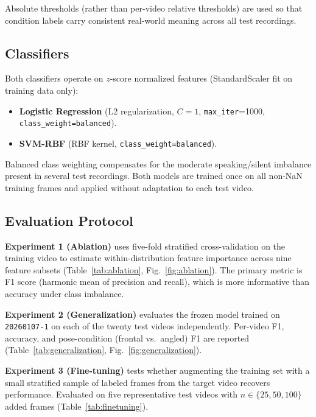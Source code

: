\documentclass[conference]{IEEEtran}
\begin{document}
Absolute thresholds (rather than per-video relative thresholds) are used so that
condition labels carry consistent real-world meaning across all test recordings.

\subsection{Classifiers}

Both classifiers operate on $z$-score normalized features
(StandardScaler fit on training data only):

\begin{itemize}
  \item \textbf{Logistic Regression} (L2 regularization, $C\!=\!1$,
        \texttt{max\_iter}=1000, \texttt{class\_weight=balanced}).
  \item \textbf{SVM-RBF} (RBF kernel, \texttt{class\_weight=balanced}).
\end{itemize}

Balanced class weighting compensates for the moderate speaking/silent imbalance
present in several test recordings.
Both models are trained once on all non-NaN training frames and applied without
adaptation to each test video.

\subsection{Evaluation Protocol}

\textbf{Experiment 1 (Ablation)} uses five-fold stratified cross-validation on the
training video to estimate within-distribution feature importance across nine feature
subsets (Table~\ref{tab:ablation}, Fig.~\ref{fig:ablation}).
The primary metric is F1 score (harmonic mean of precision and recall), which is
more informative than accuracy under class imbalance.

\textbf{Experiment 2 (Generalization)} evaluates the frozen model trained on
\texttt{20260107-1} on each of the twenty test videos independently.
Per-video F1, accuracy, and pose-condition (frontal vs.\ angled) F1 are reported
(Table~\ref{tab:generalization}, Fig.~\ref{fig:generalization}).

\textbf{Experiment 3 (Fine-tuning)} tests whether augmenting the training set with
a small stratified sample of labeled frames from the target video recovers
performance. Evaluated on five representative test videos with
$n \in \{25, 50, 100\}$ added frames (Table~\ref{tab:finetuning}).

\end{document}
